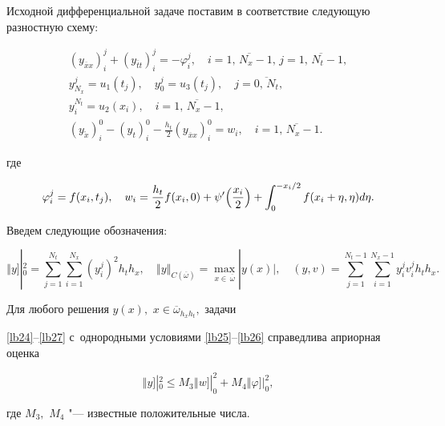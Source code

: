 Исходной дифференциальной задаче поставим в соответствие следующую разностную схему:

\begin{gather}

\label{lb24}

\left(y_{\overline{x}x}\right)_{i}^{j}+\left(y_{\overline{t}t}\right)_{i}^{j}=-\varphi_{i}^{j},\quad

i=\overline{1,\,N_x-1},\,j=\overline{1,\,N_t-1},

\\

\label{lb25}

y_{N_x}^{j}=u_1(t_j),\quad y_{0}^{j}=u_3(t_j),\quad j=\overline{0,\,N_t},

\\

\label{lb26}

y_{i}^{N_t}=u_2(x_i),\quad i=\overline{1,\,N_x-1},

\\

\label{lb27}

\left(y_{\mathring{x}}\right)_{i}^{0}-\left(y_{t}\right)_{i}^{0}-

\frac{h_t}{2} \left(y_{\overline{x}x}\right)_{i}^{0}=w_i,\quad i=\overline{1,\,N_x-1}.

\end{gather}

где 

$$\varphi_{i}^{j}=f(x_i,t_j),\quad  w_i=\frac{h_t}{2} f(x_i,0)+\psi'\Bigl(\frac{x_i}{2}\Bigr)

+\int _{0}^{{-x_i}/{2}}f(x_i+\eta,\eta)d\eta.$$



Введем следующие  обозначения:

\[

\left\Vert y\right.]|_{0}^{2}=\sum\limits_{j=1}^{N_t}\sum\limits_{i=1}^{N_x}\left(y_{i}^{j}\right)^2 h_t h_x,\quad 

\left\Vert y \right\Vert_{C(\overline{\omega})}=\max\limits_{x\in\,\overline{\omega}}|y(x)|,

\quad 

(y,v)=\sum\limits_{j=1}^{N_t-1}\sum\limits_{i=1}^{N_x-1}y_{i}^{j} v_{i}^{j} h_t h_x.

\]





\begin{theorem}[2]Для любого решения $y(x),$ $x \in \overline{\omega}_{h_x h_t},$ задачи  

\eqref{lb24}--\eqref{lb27} с~однородными условиями \eqref{lb25}--\eqref{lb26} справедлива априорная оценка

\[

\left\Vert y\right.]|_{0}^{2}\leqslant M_3\left\Vert w \right.]|_{0}^{2}+M_4 \left\Vert \varphi \right.]|_{0}^{2},

\]

где $M_3,$ $M_4$ "--- известные положительные числа$.$

\end{theorem}



